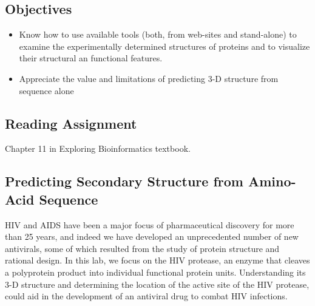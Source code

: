 

\long{}



\vspace*{-.1in}
\subsection*{Objectives}
\vspace*{-.1in}

\begin{itemize}
	\item Know how to use available tools (both, from web-sites and stand-alone) to examine the experimentally determined structures of proteins and to visualize their structural an functional features. 
	\item Appreciate the value and limitations of predicting 3-D structure from sequence alone 

\end{itemize}

\vspace*{-.1in}
\subsection*{Reading Assignment}
\vspace*{-.1in}
Chapter 11 in Exploring Bioinformatics textbook.



\vspace*{-.1in}
\subsection*{Predicting Secondary Structure from Amino-Acid Sequence}
\vspace*{-.1in} 

HIV and AIDS have been a major focus of pharmaceutical discovery for more than 25 years, and indeed we have developed an unprecedented number of new antivirals, some of which resulted from the study of protein structure and rational design.  In this lab, we focus on the HIV protease, an enzyme that cleaves a polyprotein product into individual functional protein units. Understanding its 3-D structure and determining the location of the active site of the HIV protease, could aid in the development of an antiviral drug to combat HIV infections.

